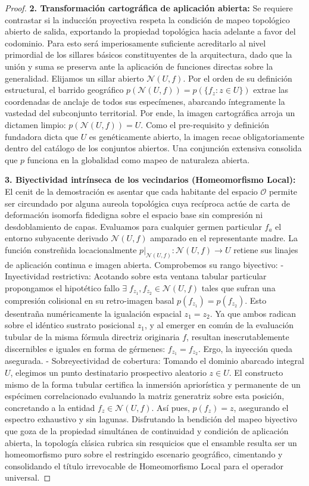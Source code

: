 \documentclass[11pt,a4paper]{article}
\theoremstyle{definition}
\theoremstyle{remark}
\numberwithin{equation}{section}
\begin{document}
\begin{proof}
\textbf{2. Transformación cartográfica de aplicación abierta:}
Se requiere contrastar si la inducción proyectiva respeta la condición de mapeo topológico abierto de salida, exportando la propiedad topológica hacia adelante a favor del codominio. Para esto será imperiosamente suficiente acreditarlo al nivel primordial de los sillares básicos constituyentes de la arquitectura, dado que la unión y suma se preserva ante la aplicación de funciones directas sobre la generalidad.
Elijamos un sillar abierto $\mathcal{N}(U, f)$. Por el orden de su definición estructural, el barrido geográfico $p(\mathcal{N}(U, f)) = p( \{ f_z : z \in U \} )$ extrae las coordenadas de anclaje de todos sus especímenes, abarcando íntegramente la vastedad del subconjunto territorial. Por ende, la imagen cartográfica arroja un dictamen limpio: $p(\mathcal{N}(U, f)) = U$.
Como el pre-requisito y definición fundadora dicta que $U$ es genéticamente abierto, la imagen recae obligatoriamente dentro del catálogo de los conjuntos abiertos. Una conjunción extensiva consolida que $p$ funciona en la globalidad como mapeo de naturaleza abierta.

\textbf{3. Biyectividad intrínseca de los vecindarios (Homeomorfismo Local):}
El cenit de la demostración es asentar que cada habitante del espacio $\mathcal{O}$ permite ser circundado por alguna aureola topológica cuya recíproca actúe de carta de deformación isomorfa fidedigna sobre el espacio base sin compresión ni desdoblamiento de capas.
Evaluamos para cualquier germen particular $f_a$ el entorno subyacente derivado $\mathcal{N}(U, f)$ amparado en el representante madre. La función constreñida locacionalmente $p|_{\mathcal{N}(U, f)} : \mathcal{N}(U, f) \to U$ retiene sus linajes de aplicación continua e imagen abierta. Comprobemos su rango biyectivo:
- Inyectividad restrictiva: Acotando sobre esta ventana tabular particular propongamos el hipotético fallo $\exists \; f_{z_1}, f_{z_2} \in \mathcal{N}(U, f)$ tales que sufran una compresión colisional en su retro-imagen basal $p(f_{z_1}) = p(f_{z_2})$. Esto desentraña numéricamente la igualación espacial $z_1 = z_2$. Ya que ambos radican sobre el idéntico sustrato posicional $z_1$, y al emerger en común de la evaluación tubular de la misma fórmula directriz originaria $f$, resultan inescrutablemente discernibles e iguales en forma de gérmenes: $f_{z_1} = f_{z_2}$. Ergo, la inyección queda asegurada.
- Sobreyectividad de cobertura: Tomando el dominio abarcado integral $U$, elegimos un punto destinatario prospectivo aleatorio $z \in U$. El constructo mismo de la forma tubular certifica la inmersión apriorística y permanente de un espécimen correlacionado evaluando la matriz generatriz sobre esta posición, concretando a la entidad $f_z \in \mathcal{N}(U, f)$. Así pues, $p(f_z) = z$, asegurando el espectro exhaustivo y sin lagunas.
Disfrutando la bendición del mapeo biyectivo que goza de la propiedad simultánea de continuidad y condición de aplicación abierta, la topología clásica rubrica sin resquicios que el ensamble resulta ser un homeomorfismo puro sobre el restringido escenario geográfico, cimentando y consolidando el título irrevocable de Homeomorfismo Local para el operador universal.
\end{proof}
\end{document}
